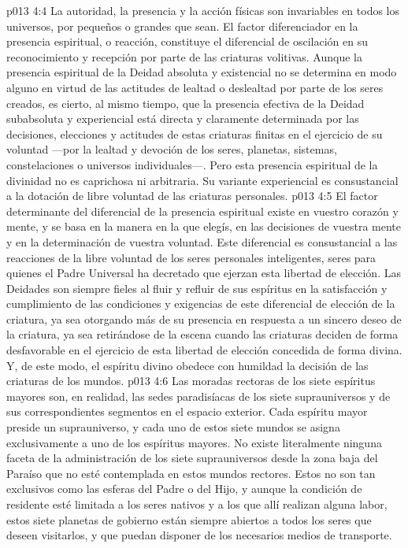 \vs p013 4:4 \pc La autoridad, la presencia y la acción físicas son invariables en todos los universos, por pequeños o grandes que sean. El factor diferenciador en la presencia espiritual, o reacción, constituye el diferencial de oscilación en su reconocimiento y recepción por parte de las criaturas volitivas. Aunque la presencia espiritual de la Deidad absoluta y existencial no se determina en modo alguno en virtud de las actitudes de lealtad o deslealtad por parte de los seres creados, es cierto, al mismo tiempo, que la presencia efectiva de la Deidad subabsoluta y experiencial está directa y claramente determinada por las decisiones, elecciones y actitudes de estas criaturas finitas en el ejercicio de su voluntad ---por la lealtad y devoción de los seres, planetas, sistemas, constelaciones o universos individuales---. Pero esta presencia espiritual de la divinidad no es caprichosa ni arbitraria. Su variante experiencial es consustancial a la dotación de libre voluntad de las criaturas personales.
\vs p013 4:5 El factor determinante del diferencial de la presencia espiritual existe en vuestro corazón y mente, y se basa en la manera en la que elegís, en las decisiones de vuestra mente y en la determinación de vuestra voluntad. Este diferencial es consustancial a las reacciones de la libre voluntad de los seres personales inteligentes, seres para quienes el Padre Universal ha decretado que ejerzan esta libertad de elección. Las Deidades son siempre fieles al fluir y refluir de sus espíritus en la satisfacción y cumplimiento de las condiciones y exigencias de este diferencial de elección de la criatura, ya sea otorgando más de su presencia en respuesta a un sincero deseo de la criatura, ya sea retirándose de la escena cuando las criaturas deciden de forma desfavorable en el ejercicio de esta libertad de elección concedida de forma divina. Y, de este modo, el espíritu divino obedece con humildad la decisión de las criaturas de los mundos.
\vs p013 4:6 \pc Las moradas rectoras de los siete espíritus mayores son, en realidad, las sedes paradisíacas de los siete suprauniversos y de sus correspondientes segmentos en el espacio exterior. Cada espíritu mayor preside un suprauniverso, y cada uno de estos siete mundos se asigna exclusivamente a uno de los espíritus mayores. No existe literalmente ninguna faceta de la administración de los siete suprauniversos desde la zona baja del Paraíso que no esté contemplada en estos mundos rectores. Estos no son tan exclusivos como las esferas del Padre o del Hijo, y aunque la condición de residente esté limitada a los seres nativos y a los que allí realizan alguna labor, estos siete planetas de gobierno están siempre abiertos a todos los seres que deseen visitarlos, y que puedan disponer de los necesarios medios de transporte.

